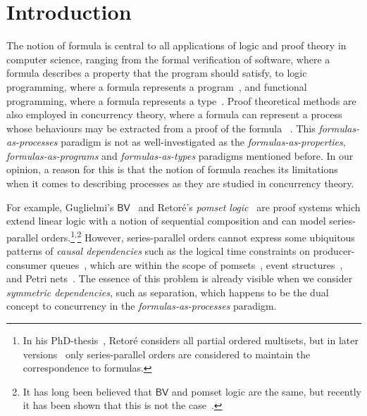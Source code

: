 \documentclass{lmcs} %
\theoremstyle{plain}
\begin{document}
\maketitle






\setcounter{tocdepth}{1}

\begingroup
\vspace*{-0.5cm}
\let\clearpage\relax
\tableofcontents
\endgroup


\section{Introduction}
\label{sec:intro}



The notion of formula is central to all applications of logic and
proof theory in computer science, ranging from the formal verification
of software, where a formula describes a property that the program
should satisfy, to logic programming, where a formula represents a
program~\cite{miller:uniform, Kobayashi1993}, and functional programming, where a
formula represents a type~\cite{howard:80}. Proof theoretical methods
are also employed in concurrency theory, where a formula can represent a
process whose behaviours may be extracted from a proof of the formula~%
\cite{miller:pi,bruscoli:02,FAGES200114,deng_simmons_cervesato_2016,
	OLARTE201746,NIGAM201735,horne:19, Horne2019b,Horne2020}.
%
This \emph{formulas-as-processes} paradigm
is not as well-investigated as the \emph{formulas-as-properties},
\emph{formulas-as-programs} and \emph{formulas-as-types} paradigms
mentioned before. In our opinion, a reason for this is that
the notion of formula reaches its limitations when it comes to
describing processes as they are studied in concurrency theory.

For example, Guglielmi's $\textsf{BV}$~\cite{gug:SIS} and Retor\'e's \emph{pomset
  logic}~\cite{Retore1997}
are proof systems which extend linear logic with a notion of
sequential composition and can model series-parallel orders.\footnote{In his PhD-thesis~\cite{retore:phd}, Retor\'e considers all partial ordered multisets, but in later versions~\cite{retore:21} only series-parallel orders are considered to maintain the correspondence to formulas.}$^,$\footnote{It has long been believed that $\textsf{BV}$ and pomset
  logic are the same, but recently it has been shown that this is not the case~\cite{tito:lutz:csl22,SIS-III}.} 
However,
series-parallel orders cannot express some ubiquitous patterns of
\emph{causal dependencies} such as the logical time constraints on producer-consumer
queues~\cite{Lodaya2000}, which are within the scope of
pomsets~\cite{Pratt1986}, event structures~\cite{Nielsen1985}, and
Petri nets~\cite{Petri1976}.  The essence of this problem is already
visible when we consider \textit{symmetric dependencies}, such as
separation, which happens to be the dual
concept to concurrency in the \emph{formulas-as-processes}
paradigm.
\end{document}
